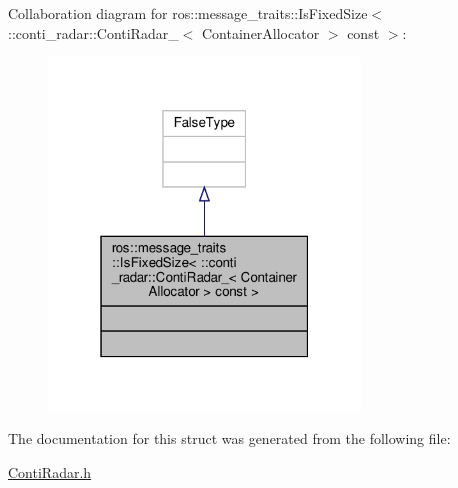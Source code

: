 Collaboration diagram for ros\+:\+:message\+\_\+traits\+:\+:Is\+Fixed\+Size$<$ \+:\+:conti\+\_\+radar\+:\+:Conti\+Radar\+\_\+$<$ Container\+Allocator $>$ const $>$\+:\nopagebreak
\begin{figure}[H]
\begin{center}
\leavevmode
\includegraphics[width=235pt]{de/d53/structros_1_1message__traits_1_1IsFixedSize_3_01_1_1conti__radar_1_1ContiRadar___3_01ContainerAl204d8d458e8aee99452a450edb629c9e}
\end{center}
\end{figure}


The documentation for this struct was generated from the following file\+:\begin{DoxyCompactItemize}
\item 
\hyperlink{ContiRadar_8h}{Conti\+Radar.\+h}\end{DoxyCompactItemize}
